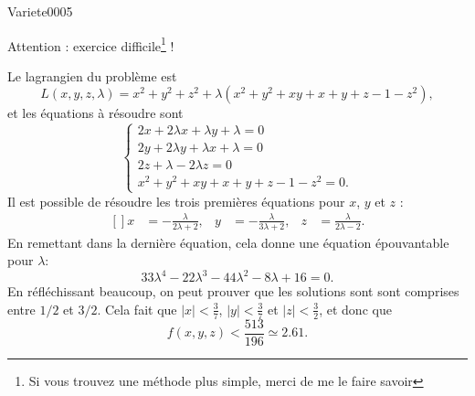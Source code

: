 
\begin{corrige}{Variete0005}

	Attention : exercice difficile\footnote{Si vous trouvez une méthode plus simple, merci de me le faire savoir} !

	Le lagrangien du problème est
	\begin{equation}
		L(x,y,z,\lambda)=x^2+y^2+z^2+\lambda(x^2+y^2+xy+x+y+z-1-z^2),
	\end{equation}
	et les équations à résoudre sont
	\begin{equation}
		\left\{
		\begin{array}{ll}
			2x+2\lambda x+\lambda y+\lambda=0\\
			2y+2\lambda y+\lambda x+\lambda =0\\
			2z+\lambda-2\lambda z=0\\
			x^2+y^2+xy+x+y+z-1-z^2=0.
		\end{array}
		\right.
	\end{equation}
	Il est possible de résoudre les trois premières équations pour $x$, $y$ et $z$ :
	\begin{equation}
		\begin{aligned}[]
			x&=-\frac{ \lambda }{ 2\lambda+2 },&y&=-\frac{ \lambda }{ 3\lambda+2 },&z&=\frac{ \lambda }{ 2\lambda-2 }.
		\end{aligned}
	\end{equation}
	En remettant dans la dernière équation, cela donne une équation épouvantable pour $\lambda$:
	\begin{equation}
		33\lambda^4-22\lambda^3-44\lambda^2-8\lambda+16=0.
	\end{equation}
	En réfléchissant beaucoup, on peut prouver que les solutions sont sont comprises entre $1/2$ et $3/2$. Cela fait que $| x |<\frac{ 3 }{ 7 }$, $| y |<\frac{ 3 }{ 7 }$ et $| z |<\frac{ 3 }{ 2 }$, et donc que
	\begin{equation}
		f(x,y,z)<\frac{ 513 }{ 196 }\simeq 2.61.
	\end{equation}
	
		

\end{corrige}
